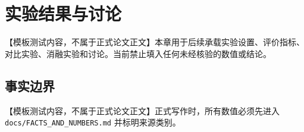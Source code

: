 \chapter{实验结果与讨论}

【模板测试内容，不属于正式论文正文】本章用于后续承载实验设置、评价指标、对比实验、消融实验和讨论。当前禁止填入任何未经核验的数值或结论。

\section{事实边界}

【模板测试内容，不属于正式论文正文】正式写作时，所有数值必须先进入 \texttt{docs/FACTS\_AND\_NUMBERS.md} 并标明来源类别。

